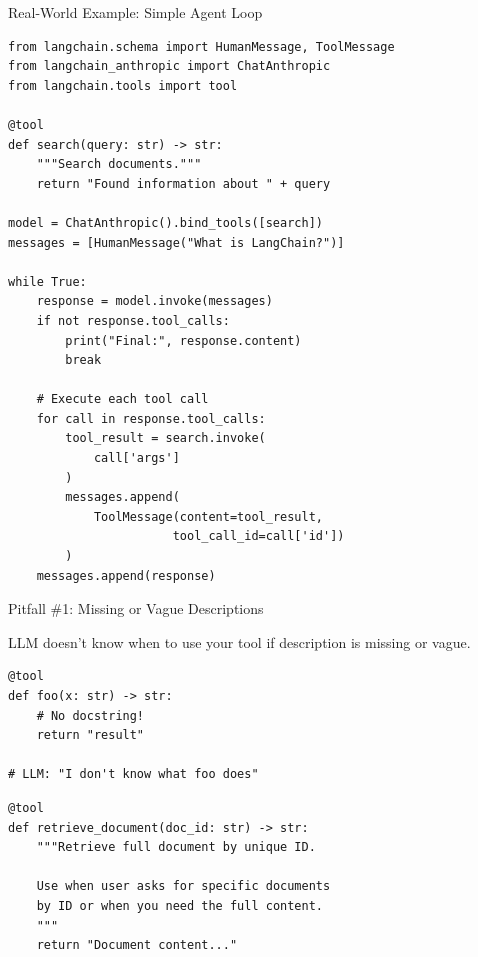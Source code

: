 \documentclass[aspectratio=169,11pt]{beamer}
\begin{document}
\begin{frame}[fragile,shrink=3]{Real-World Example: Simple Agent Loop}
\begin{codebox}
\begin{lstlisting}
from langchain.schema import HumanMessage, ToolMessage
from langchain_anthropic import ChatAnthropic
from langchain.tools import tool

@tool
def search(query: str) -> str:
    """Search documents."""
    return "Found information about " + query

model = ChatAnthropic().bind_tools([search])
messages = [HumanMessage("What is LangChain?")]

while True:
    response = model.invoke(messages)
    if not response.tool_calls:
        print("Final:", response.content)
        break

    # Execute each tool call
    for call in response.tool_calls:
        tool_result = search.invoke(
            call['args']
        )
        messages.append(
            ToolMessage(content=tool_result,
                       tool_call_id=call['id'])
        )
    messages.append(response)
\end{lstlisting}
\end{codebox}
\end{frame}

\begin{frame}[fragile,shrink=2]{Pitfall \#1: Missing or Vague Descriptions}
\begin{warningbox}
LLM doesn't know when to use your tool if description is missing or vague.
\end{warningbox}

\begin{codebox}
\begin{lstlisting}
@tool
def foo(x: str) -> str:
    # No docstring!
    return "result"

# LLM: "I don't know what foo does"
\end{lstlisting}
\end{codebox}

\begin{codebox}
\begin{lstlisting}
@tool
def retrieve_document(doc_id: str) -> str:
    """Retrieve full document by unique ID.

    Use when user asks for specific documents
    by ID or when you need the full content.
    """
    return "Document content..."
\end{lstlisting}
\end{codebox}
\end{frame}
\end{document}
